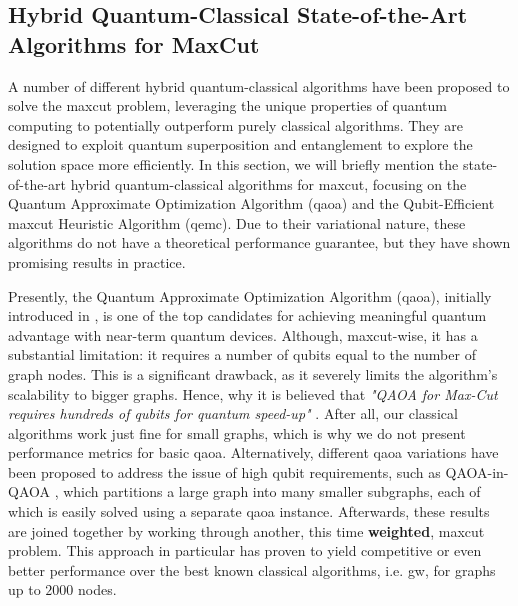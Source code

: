 


\subsection{Hybrid Quantum-Classical State-of-the-Art Algorithms for MaxCut}
\label{section:Hybrid-Quantum-Classical-State-of-the-Art}

A number of different hybrid quantum-classical algorithms have been proposed to solve the \acrshort{maxcut} problem, leveraging the unique properties of quantum computing to potentially outperform purely classical algorithms. They are designed to exploit quantum superposition and entanglement to explore the solution space more efficiently. In this section, we will briefly mention the state-of-the-art hybrid quantum-classical algorithms for \acrshort{maxcut}, focusing on the Quantum Approximate Optimization Algorithm (\acrshort{qaoa}) and the Qubit-Efficient \acrshort{maxcut} Heuristic Algorithm (\acrshort{qemc}). Due to their variational nature, these algorithms do not have a theoretical performance guarantee, but they have shown promising results in practice.

Presently, the Quantum Approximate Optimization Algorithm (\acrshort{qaoa}), initially introduced in \cite{farhi2014quantum}, is one of the top candidates for achieving meaningful quantum advantage with near-term quantum devices. Although, \acrshort{maxcut}-wise, it has a substantial limitation: it requires a number of qubits equal to the number of graph nodes. This is a significant drawback, as it severely limits the algorithm's scalability to bigger graphs. Hence, why it is believed that \textit{"QAOA for Max-Cut requires hundreds of qubits for quantum speed-up"} \cite{Guerreschi2019}. After all, our classical algorithms work just fine for small graphs, which is why we do not present performance metrics for basic \acrshort{qaoa}. Alternatively, different \acrshort{qaoa} variations have been proposed to address the issue of high qubit requirements, such as QAOA-in-QAOA \cite{zhou2022qaoainqaoa}, which partitions a large graph into many smaller subgraphs, each of which is easily solved using a separate \acrshort{qaoa} instance. Afterwards, these results are joined together by working through another, this time \textbf{weighted}, \acrshort{maxcut} problem. This approach in particular has proven to yield competitive or even better performance over the best known classical algorithms, i.e. \acrshort{gw}, for graphs up to $2000$ nodes.

